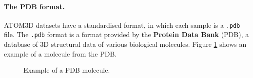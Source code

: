 \paragraph{The PDB format.} ATOM3D datasets have a standardised format, in which each sample is a \texttt{.pdb} file. The \texttt{.pdb} format is a format provided by the \textbf{Protein Data Bank} (PDB), a database of 3D structural data of various biological molecules. Figure \ref{pdb} shows an example of a molecule from the PDB.
\begin{figure}
    \centering
    \hspace{0.3in}
    
    \caption{Example of a PDB molecule.}
    \label{pdb}
\end{figure}
